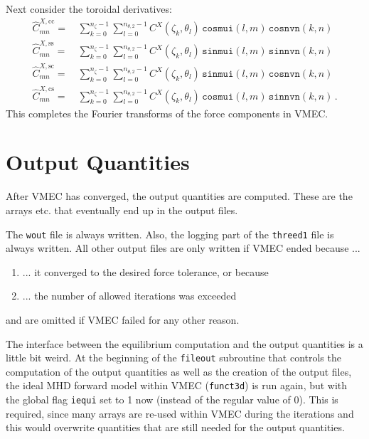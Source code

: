 Next consider the toroidal derivatives:
\begin{align}
  \hat{C}^{X,\mathrm{cc}}_{mn} =&\, \sum\limits_{k=0}^{n_\zeta-1} \sum\limits_{l=0}^{n_{\theta,2}-1} C^{X}(\zeta_k, \theta_l) \, \texttt{cosmui}(l,m) \, \texttt{cosnvn}(k,n) \\
  \hat{C}^{X,\mathrm{ss}}_{mn} =&\, \sum\limits_{k=0}^{n_\zeta-1} \sum\limits_{l=0}^{n_{\theta,2}-1} C^{X}(\zeta_k, \theta_l) \, \texttt{sinmui}(l,m) \, \texttt{sinnvn}(k,n) \\
  \hat{C}^{X,\mathrm{sc}}_{mn} =&\, \sum\limits_{k=0}^{n_\zeta-1} \sum\limits_{l=0}^{n_{\theta,2}-1} C^{X}(\zeta_k, \theta_l) \, \texttt{sinmui}(l,m) \, \texttt{cosnvn}(k,n) \\
  \hat{C}^{X,\mathrm{cs}}_{mn} =&\, \sum\limits_{k=0}^{n_\zeta-1} \sum\limits_{l=0}^{n_{\theta,2}-1} C^{X}(\zeta_k, \theta_l) \, \texttt{cosmui}(l,m) \, \texttt{sinnvn}(k,n) \, .
\end{align}
This completes the Fourier transforms of the force components in VMEC.





\section{Output Quantities}
After VMEC has converged, the output quantities are computed.
These are the arrays etc. that eventually end up in the output files.

The \texttt{wout} file is always written.
Also, the logging part of the \texttt{threed1} file is always written.
All other output files are only written if VMEC ended because ...
\begin{enumerate}
 \item ... it converged to the desired force tolerance, or because
 \item ... the number of allowed iterations was exceeded
\end{enumerate}
and are omitted if VMEC failed for any other reason.

The interface between the equilibrium computation and the output quantities
is a little bit weird.
At the beginning of the \texttt{fileout} subroutine that controls the computation
of the output quantities as well as the creation of the output files,
the ideal MHD forward model within VMEC (\texttt{funct3d}) is run again,
but with the global flag \texttt{iequi} set to 1 now (instead of the regular value of 0).
%
This is required, since many arrays are re-used within VMEC during the iterations
and this would overwrite quantities that are still needed for the output quantities.

